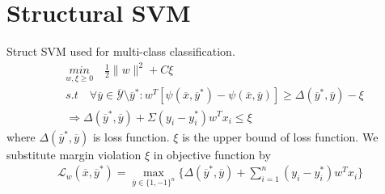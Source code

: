 \documentclass{article} %
\begin{document}
\section{Structural SVM}

Struct SVM used for multi-class classification.
\begin{equation*}
\begin{split}
& \underset{w,\xi \geq 0}{min} \quad \frac{1}{2}\|w\|^2+C\xi\\
& s.t \quad \forall\overline{y} \in \overline{\mathcal{Y}}\setminus\overline{y}^*:w^T[\psi(\overline{x},\overline{y}^*)- \psi(\overline{x},\overline{y})]\geq \Delta(\overline{y}^*,\overline{y})-\xi\\
& \Rightarrow \Delta(\overline{y}^*,\overline{y}) + \Sigma (y_i - y_i^*)w^Tx_i \leq \xi
\end{split}
\end{equation*}
where $\Delta(\overline{y}^*,\overline{y})$ is loss function.	
$\xi$ is the upper bound of loss function.
We substitute margin violation $\xi$ in objective function by
\begin{align}
\label{eqn:1}
\mathcal L_w(\overline{x},\overline{y}^*)=\max_{\overline{y}\in\{1,-1\}^n}\{\Delta(\overline{y}^*,\overline{y}) + \sum_{i=1}^n (y_i - y_i^*)w^Tx_i\}
\end{align}
\end{document}
